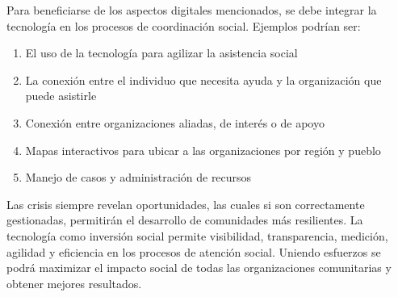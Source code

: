 \par Para beneficiarse de los aspectos digitales mencionados, se debe integrar la tecnología en los procesos de coordinación social. Ejemplos podrían ser:
\begin{enumerate}
    \item El uso de la tecnología para agilizar la asistencia social
    \item La conexión entre el individuo que necesita ayuda y la organización que puede asistirle
    \item Conexión entre organizaciones aliadas, de interés o de apoyo
    \item Mapas interactivos para ubicar a las organizaciones por región y pueblo
    \item Manejo de casos y administración de recursos
\end{enumerate}
\par Las crisis siempre revelan oportunidades, las cuales si son correctamente gestionadas,
permitirán el desarrollo de comunidades más resilientes. La tecnología como inversión social permite visibilidad, transparencia, medición, agilidad y eficiencia en los procesos de atención social. Uniendo esfuerzos se podrá maximizar el impacto social de todas las organizaciones comunitarias y obtener mejores resultados.
\clearpage
